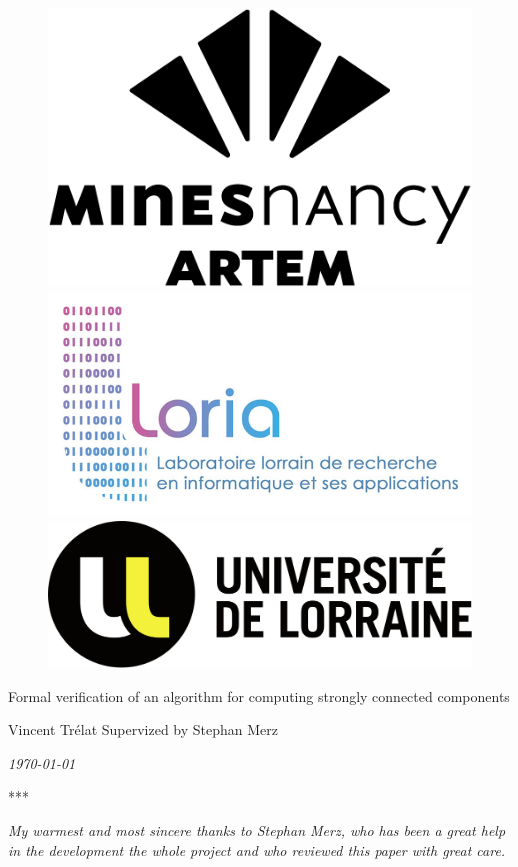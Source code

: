 \documentclass[a4 paper, 12pt]{article}
\newcommand\blankpage{%
    \null
    \thispagestyle{empty}%
    \addtocounter{page}{-1}%
    \newpage}
\begin{document}
\begin{titlepage}
    \begin{figure}[!h]
        \centering
        \includegraphics[height = .1\textwidth]{img/logoartem.png}
        \hspace{1cm}
        \includegraphics[height = .1\textwidth]{img/logoloria.jpg}
        \hspace{1cm}
        \includegraphics[height = .1\textwidth]{img/logoUL.png}
    \end{figure}
    \vspace{3cm}

    \begin{center}
        \huge{Formal verification of an algorithm for computing strongly connected components}
    \end{center}
    \vspace{3 cm}
    \begin{center}
        Vincent Trélat
        \BlankLine
        \BlankLine
        Supervized by Stephan Merz
    \end{center}
    \vspace{3 cm}
    \begin{center}
        \textit{\today}
    \end{center}
    \vspace{3 cm}
    \begin{center}
        ***
    \end{center}
    
\end{titlepage}
\restoregeometry

\blankpage

\hfill
\begin{minipage}{.45\textwidth}
    \textit{
    My warmest and most sincere thanks to Stephan Merz, who has been a great help in the development the whole project and who reviewed this paper with great care.
    }
\end{minipage}
\end{document}
